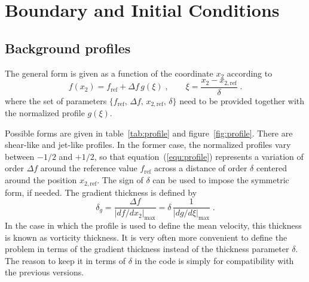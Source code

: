 \chapter{Boundary and Initial Conditions}\label{sec:bcs}

\section{Background profiles}

The general form is given as a function of the coordinate $x_2$ according to
\begin{equation}
    f(x_2) = f_\text{ref}+\Delta f\, g(\xi) \;,\qquad 
    \xi=\frac{x_2-x_{2,\text{ref}}}{\delta} \;.
    \label{equ:profile}
\end{equation}
where the set of parameters $\{f_\text{ref},\,\Delta f,\,x_{2,\text{ref}},\,\delta\}$ need to be provided together with the normalized profile $g(\xi)$.

Possible forms are given in table~\ref{tab:profile} and figure~\ref{fig:profile}. There are shear-like and jet-like profiles. In the former case, the normalized profiles vary between $-1/2$ and $+1/2$, so that equation~(\ref{equ:profile}) represents a variation of order $\Delta f$ around the reference value $f_\text{ref}$ across a distance of order $\delta$ centered around the position $x_{2,\text{ref}}$. The sign of $\delta$ can be used to impose the symmetric form, if needed. The gradient thickness is defined by
\begin{equation}
    \delta_g =\frac{\Delta f}{|d f/d x_2|_\text{max}} =
    \delta\,\frac{1}{|d g/d \xi|_\text{max}} \;.
    \label{equ:deltag}
\end{equation}
In the case in which the profile is used to define the mean velocity, this thickness is known as vorticity thickness.  It is very often more convenient to define the problem in terms of the gradient thickness instead of the thickness parameter $\delta$. The reason to keep it in terms of $\delta$ in the code is simply for compatibility with the previous versions.

